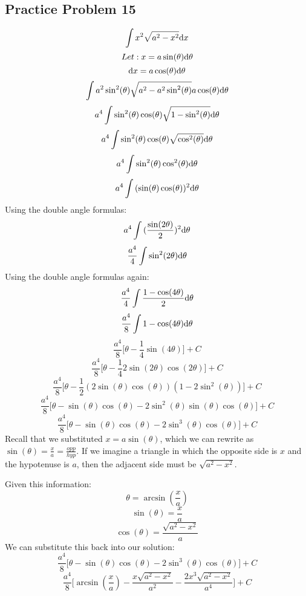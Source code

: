 \documentclass[letterpaper, 12pt]{math}
\begin{document}
\subsection*{Practice Problem 15}
\[ \int{x^{2}\sqrt{a^{2}-x^{2}}\mathrm{d}{x}} \]
\[ Let: x = a\sin(\theta)\mathrm{d}{\theta} \]
\[ \mathrm{d}{x} = a\cos(\theta)\mathrm{d}{\theta} \]
\[ \int{a^{2}\sin^{2}(\theta)
   \sqrt{a^{2}-a^{2}\sin^{2}(\theta)}a\cos(\theta)\mathrm{d}{\theta}} \]
\[ a^{4}\int{\sin^{2}(\theta)\cos(\theta)
   \sqrt{1-\sin^{2}(\theta)}\mathrm{d}{\theta}} \]
\[ a^{4}\int{\sin^{2}(\theta)\cos(\theta)
   \sqrt{\cos^{2}(\theta)}\mathrm{d}{\theta}} \]
\[ a^{4}\int{\sin^{2}(\theta)\cos^{2}(\theta)\mathrm{d}{\theta}} \]
\[ a^{4}\int{(\sin(\theta)\cos(\theta))^{2}\mathrm{d}{\theta}} \]
Using the double angle formulas:
\[ a^{4}\int{(\frac{\sin(2\theta)}{2})^{2}\mathrm{d}{\theta}} \]
\[ \frac{a^{4}}{4}\int{\sin^{2}(2\theta)\mathrm{d}{\theta}} \]
Using the double angle formulas again:
\[ \frac{a^{4}}{4}\int{\frac{1-\cos(4\theta)}{2}\mathrm{d}{\theta}} \]
\[ \frac{a^{4}}{8}\int{1-\cos(4\theta)\mathrm{d}{\theta}} \]
\[ \frac{a^{4}}{8}\bigg[\theta-\frac{1}{4}\sin(4\theta)\bigg]+C \]
\[ \frac{a^{4}}{8}\bigg[\theta-\frac{1}{4}2\sin(2\theta)\cos(2\theta)\bigg]+C \]
\[ \frac{a^{4}}{8}\bigg[\theta-
   \frac{1}{2}(2\sin(\theta)\cos(\theta))(1-2\sin^{2}(\theta))\bigg]+C \]
\[ \frac{a^{4}}{8}\bigg[\theta-
   \sin(\theta)\cos(\theta)-2\sin^{2}(\theta)\sin(\theta)\cos(\theta)\bigg]+C \]
\[ \frac{a^{4}}{8}\bigg[\theta-
   \sin(\theta)\cos(\theta)-2\sin^{3}(\theta)\cos(\theta)\bigg]+C \]
Recall that we substituted \( x = a\sin(\theta) \), which we can rewrite as
\( \sin(\theta) = \frac{x}{a} = \frac{opp}{hyp} \). If we imagine a triangle in
which the opposite side is \( x \) and the hypotenuse is \( a \), then the
adjacent side must be \( \sqrt{a^{2}-x^{2}} \).
\begin{center}
\end{center}
Given this information:
\[ \theta = \arcsin(\frac{x}{a}) \]
\[ \sin(\theta) = \frac{x}{a} \]
\[ \cos(\theta) = \frac{\sqrt{a^{2}-x^{2}}}{a} \]
We can substitute this back into our solution:
\[ \frac{a^{4}}{8}\bigg[\theta-
\sin(\theta)\cos(\theta)-2\sin^{3}(\theta)\cos(\theta)\bigg]+C \]
\[ \frac{a^{4}}{8}\bigg[\arcsin(\frac{x}{a})-
   \frac{x\sqrt{a^{2}-x^{2}}}{a^{2}}-
   \frac{2x^{3}\sqrt{a^{2}-x^{2}}}{a^{4}}\bigg]+C \]
\end{document}
